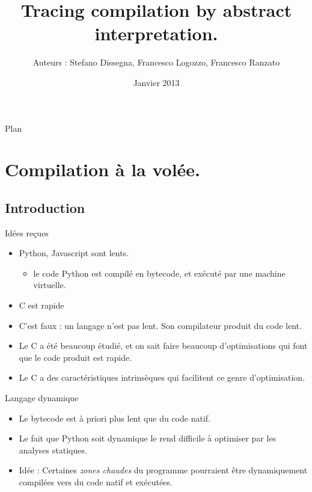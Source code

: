 \documentclass{beamer}
\title{Tracing compilation by abstract
interpretation.}
\author[Thomas Bourgeat]{Auteurs : Stefano Dissegna, Francesco Logozzo, Francesco Ranzato}
\date{Janvier 2013}
\begin{document}
\begin{frame}
  \titlepage
\end{frame}

\begin{frame}{Plan}
  \tableofcontents
\end{frame}

\section{Compilation à la volée.}


\subsection{Introduction}

\begin{frame}{Idées reçues}
\begin{itemize}
\item Python, Javascript sont lents.
\begin{itemize}
\item le code Python est compilé en bytecode, et exécuté par une machine
virtuelle.
\end{itemize}
\item C est rapide
\pause
\item C'est faux : un langage n'est pas lent. Son compilateur produit du code
lent.
\pause
\item Le C a été beaucoup étudié, et on sait faire beaucoup d'optimisations
qui font que le code produit est rapide. 
\item Le C a des caractéristiques intrinsèques qui facilitent ce genre
d'optimisation.
\end{itemize}
\end{frame}

\begin{frame}{Langage dynamique}
\begin{itemize}
\item Le bytecode est à priori plus lent que du code natif.
\item Le fait que Python soit dynamique le rend difficile à optimiser par les
analyses statiques.
\pause
\item Idée : Certaines \emph{zones chaudes} du programme pourraient être
dynamiquement compilées vers du code natif et exécutées.
\end{itemize}
\end{frame}
\end{document}
